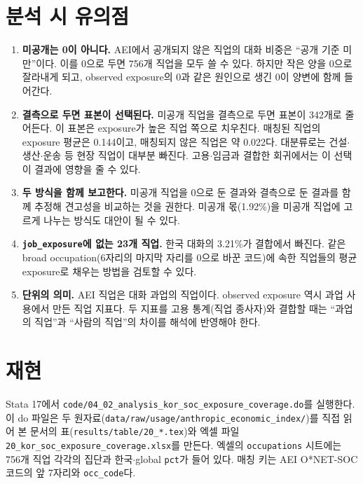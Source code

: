 \documentclass[11pt]{article}
\begin{document}
\section{분석 시 유의점}

\begin{enumerate}[leftmargin=*]
  \item \textbf{미공개는 0이 아니다.} AEI에서 공개되지 않은 직업의 대화 비중은 ``공개 기준 미만''이다. 이를 0으로 두면 756개 직업을 모두 쓸 수 있다. 하지만 작은 양을 0으로 잘라내게 되고, observed exposure의 0과 같은 원인으로 생긴 0이 양변에 함께 들어간다.
  \item \textbf{결측으로 두면 표본이 선택된다.} 미공개 직업을 결측으로 두면 표본이 342개로 줄어든다. 이 표본은 exposure가 높은 직업 쪽으로 치우친다. 매칭된 직업의 exposure 평균은 0.144이고, 매칭되지 않은 직업은 약 0.022다. 대분류로는 건설$\cdot$생산$\cdot$운송 등 현장 직업이 대부분 빠진다. 고용$\cdot$임금과 결합한 회귀에서는 이 선택이 결과에 영향을 줄 수 있다.
  \item \textbf{두 방식을 함께 보고한다.} 미공개 직업을 0으로 둔 결과와 결측으로 둔 결과를 함께 추정해 견고성을 비교하는 것을 권한다. 미공개 몫(1.92\%)을 미공개 직업에 고르게 나누는 방식도 대안이 될 수 있다.
  \item \textbf{\texttt{job\_exposure}에 없는 23개 직업.} 한국 대화의 3.21\%가 결합에서 빠진다. 같은 broad occupation(6자리의 마지막 자리를 0으로 바꾼 코드)에 속한 직업들의 평균 exposure로 채우는 방법을 검토할 수 있다.
  \item \textbf{단위의 의미.} AEI 직업은 대화 과업의 직업이다. observed exposure 역시 과업 사용에서 만든 직업 지표다. 두 지표를 고용 통계(직업 종사자)와 결합할 때는 ``과업의 직업''과 ``사람의 직업''의 차이를 해석에 반영해야 한다.
\end{enumerate}

\section{재현}

Stata 17에서 \texttt{code/04\_02\_analysis\_kor\_soc\_exposure\_coverage.do}를 실행한다. 이 do 파일은 두 원자료(\texttt{data/raw/usage/anthropic\_economic\_index/})를 직접 읽어 본 문서의 표(\texttt{results/table/20\_*.tex})와 엑셀 파일 \texttt{20\_kor\_soc\_exposure\_coverage.xlsx}를 만든다. 엑셀의 \texttt{occupations} 시트에는 756개 직업 각각의 집단과 한국$\cdot$global \texttt{pct}가 들어 있다. 매칭 키는 AEI O*NET-SOC 코드의 앞 7자리와 \texttt{occ\_code}다.

\printbibliography[title={참고문헌}]
\end{document}
